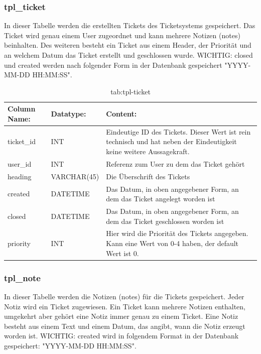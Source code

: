 \subsubsection{tpl\_ticket}

In dieser Tabelle werden die erstellten Tickets des Ticketsystems gespeichert. Das Ticket wird genau einem User zugeordnet und kann mehrere Notizen (notes) beinhalten. Des weiteren besteht ein Ticket aus einem Header, der Priorität und an welchem Datum das Ticket erstellt und geschlossen wurde.
WICHTIG: closed und created werden nach folgender Form in der Datenbank gespeichert "YYYY-MM-DD HH:MM:SS".

\begin{table}[h]
	\begin{tabular}{|p{3.5cm}|p{4cm}|p{6.2cm}|}
		\hline
		\textbf{Column Name:} & \textbf{Datatype:} & \textbf{Content:}\\
		\hline
		ticket\_id & INT & Eindeutige ID des Tickets. Dieser Wert ist rein technisch und hat neben der Eindeutigkeit keine weitere Aussagekraft.\\
		\hline
		user\_id & INT & Referenz zum User zu dem das Ticket gehört\\
		\hline
		heading & VARCHAR(45) &  Die Überschrift des Tickets\\
		\hline
		created & DATETIME & Das Datum, in oben angegebener Form, an dem das Ticket angelegt worden ist\\
		\hline
		closed & DATETIME & Das Datum, in oben angegebener Form, an dem das Ticket geschlossen worden ist\\
		\hline
		priority & INT & Hier wird die Priorität des Tickets angegeben. Kann eine Wert von 0-4 haben, der default Wert ist 0.\\
		\hline
	\end{tabular}
	\caption{tab:tpl-ticket}
\end{table}
\label{tab:tpl_ticket}

\newpage

\subsubsection{tpl\_note}

In dieser Tabelle werden die Notizen (notes) für die Tickets gespeichert. Jeder Notiz wird ein Ticket zugewiesen. Ein Ticket kann mehrere Notizen enthalten, umgekehrt aber gehört eine Notiz immer genau zu einem Ticket. Eine Notiz besteht aus einem Text und einem Datum, das angibt, wann die Notiz erzeugt worden ist.
WICHTIG: created wird in folgendem Format in der Datenbank gespeichert: "YYYY-MM-DD HH:MM:SS".

